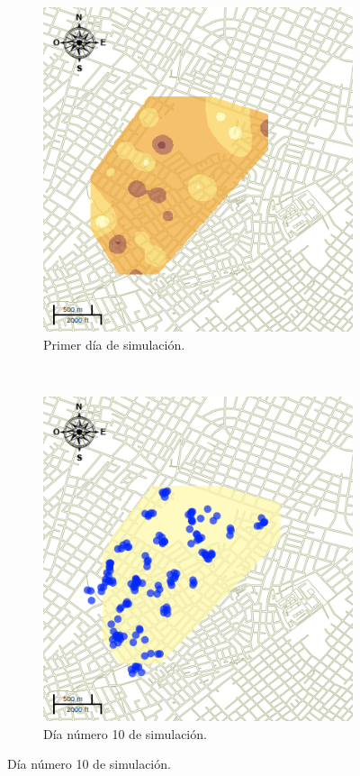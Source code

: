 \begin{figure}[!htbp]
    \centering
    \begin{subfigure}[b]{0.45\textwidth}
            \includegraphics[width=\textwidth]{capitulo-6/graphics/raster/temp-30-0.png}
            \caption{\label{fig:niveles-infestacion-30-a}Primer día de simulación.}
    \end{subfigure}
    ~~
    \begin{subfigure}[b]{0.45\textwidth}
            \includegraphics[width=\textwidth]{capitulo-6/graphics/raster/temp-30-9.png}
            \caption{\label{fig:niveles-infestacion-30-b}Día número 10 de simulación.}
    \end{subfigure}


\end{figure}
